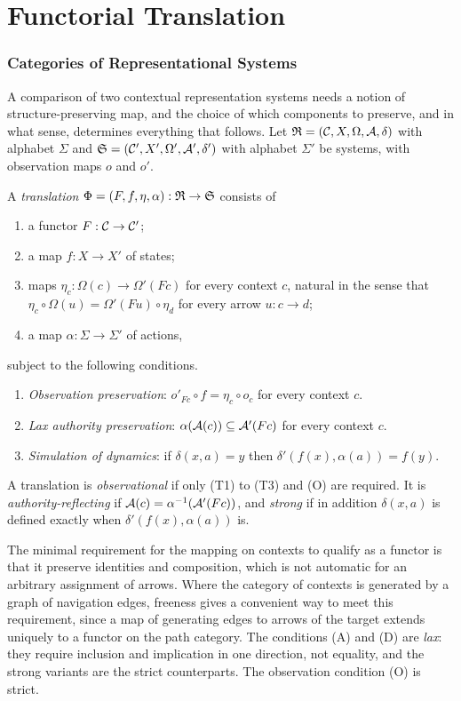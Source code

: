 \part{Functorial Translation}

\section{Categories of Representational Systems}

A comparison of two contextual representation systems needs a notion of structure-preserving map, and the choice of which components to preserve, and in what sense, determines everything that follows. Let $\mathfrak R=(\mathcal C,X,\Omega,\mathcal A,\delta)$ with alphabet $\Sigma$ and $\mathfrak S=(\mathcal C',X',\Omega',\mathcal A',\delta')$ with alphabet $\Sigma'$ be systems, with observation maps $o$ and $o'$.

\begin{definition}[Translation]\label{def:translation}
A \emph{translation} $\Phi=(F,f,\eta,\alpha):\mathfrak R\to\mathfrak S$ consists of
\begin{enumerate}[label=(T\arabic*)]
\item a functor $F:\mathcal C\to\mathcal C'$;
\item a map $f:X\to X'$ of states;
\item maps $\eta_c:\Omega(c)\to\Omega'(Fc)$ for every context $c$, natural in the sense that $\eta_c\circ\Omega(u)=\Omega'(Fu)\circ\eta_d$ for every arrow $u:c\to d$;
\item a map $\alpha:\Sigma\to\Sigma'$ of actions,
\end{enumerate}
subject to the following conditions.
\begin{enumerate}[label=(\Alph*)]
\item[(O)] \emph{Observation preservation}: $o'_{Fc}\circ f=\eta_c\circ o_c$ for every context $c$.
\item[(A)] \emph{Lax authority preservation}: $\alpha(\mathcal A(c))\subseteq\mathcal A'(Fc)$ for every context $c$.
\item[(D)] \emph{Simulation of dynamics}: if $\delta(x,a)=y$ then $\delta'(f(x),\alpha(a))=f(y)$.
\end{enumerate}
A translation is \emph{observational} if only (T1) to (T3) and (O) are required. It is \emph{authority-reflecting} if $\mathcal A(c)=\alpha^{-1}(\mathcal A'(Fc))$, and \emph{strong} if in addition $\delta(x,a)$ is defined exactly when $\delta'(f(x),\alpha(a))$ is.
\end{definition}

The minimal requirement for the mapping on contexts to qualify as a functor is that it preserve identities and composition, which is not automatic for an arbitrary assignment of arrows. Where the category of contexts is generated by a graph of navigation edges, freeness gives a convenient way to meet this requirement, since a map of generating edges to arrows of the target extends uniquely to a functor on the path category. The conditions (A) and (D) are \emph{lax}: they require inclusion and implication in one direction, not equality, and the strong variants are the strict counterparts. The observation condition (O) is strict.

